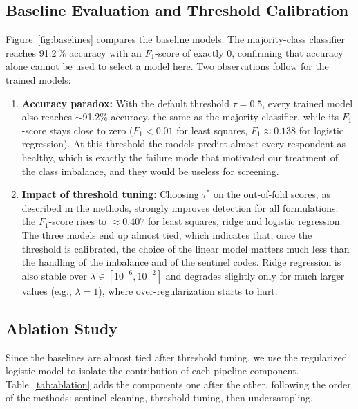 \documentclass[10pt,conference,compsocconf]{IEEEtran}
\begin{document}
\subsection{Baseline Evaluation and Threshold Calibration}
Figure~\ref{fig:baselines} compares the baseline models. The majority-class classifier reaches 91.2\,\% accuracy with an $F_1$-score of exactly 0, confirming that accuracy alone cannot be used to select a model here. Two observations follow for the trained models:
\begin{enumerate}
    \item \textbf{Accuracy paradox:} With the default threshold $\tau=0.5$, every trained model also reaches $\sim$91.2\% accuracy, the same as the majority classifier, while its $F_1$-score stays close to zero ($F_1 < 0.01$ for least squares, $F_1 \approx 0.138$ for logistic regression). At this threshold the models predict almost every respondent as healthy, which is exactly the failure mode that motivated our treatment of the class imbalance, and they would be useless for screening.
    \item \textbf{Impact of threshold tuning:} Choosing $\tau^*$ on the out-of-fold scores, as described in the methods, strongly improves detection for all formulations: the $F_1$-score rises to $\approx 0.407$ for least squares, ridge and logistic regression. The three models end up almost tied, which indicates that, once the threshold is calibrated, the choice of the linear model matters much less than the handling of the imbalance and of the sentinel codes. Ridge regression is also stable over $\lambda \in [10^{-6}, 10^{-2}]$ and degrades slightly only for much larger values (e.g., $\lambda = 1$), where over-regularization starts to hurt.
\end{enumerate}
 
\subsection{Ablation Study}
Since the baselines are almost tied after threshold tuning, we use the regularized logistic model to isolate the contribution of each pipeline component. Table~\ref{tab:ablation} adds the components one after the other, following the order of the methods: sentinel cleaning, threshold tuning, then undersampling.
 
\end{document}
